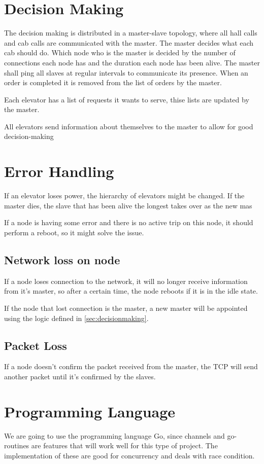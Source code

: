 \section{Decision Making}
\label{sec:decisionmaking}

The decision making is distributed in a master-slave topology, where all hall calls and cab calls are communicated with the master. The master decides what each cab should do. Which node who is the master is decided by the number of connections each node has and the duration each node has been alive. The master shall ping all slaves at regular intervals to communicate its presence. When an order is completed it is removed from the list of orders by the master.

Each elevator has a list of requests it wants to serve, thise lists are updated by the master.

All elevators send information about themselves to the master to allow for good decision-making

\section{Error Handling}
\label{sec:errorhandling}

If an elevator loses power, the hierarchy of elevators might be changed. If the master dies, the slave that has been alive the longest takes over as the new mas



If a node is having some error and there is no active trip on this node, it should perform a reboot, so it might solve the issue.

\subsection{Network loss on node}
If a node loses connection to the network, it will no longer receive information from it's master, so after a certain time, the node reboots if it is in the idle state.

If the node that lost connection is the master, a new master will be appointed using the logic defined in \autoref{sec:decisionmaking}.

\subsection{Packet Loss}
If a node doesn't confirm the packet received from the master, the TCP will send another packet until it's confirmed by the slaves. 

\subsection{}


\section{Programming Language}
We are going to use the programming language Go, since channels and go-routines are features that will work well for this type of project. The implementation of these are good for concurrency and deals with race condition. 